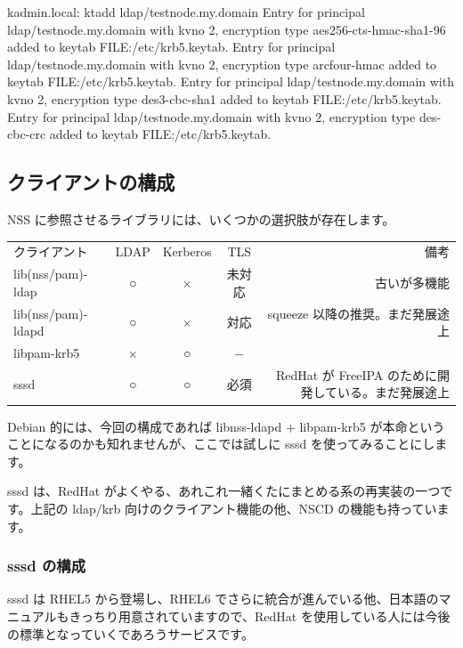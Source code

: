 \documentclass[mingoth,a4paper]{jsarticle}
\begin{document}
\begin{commandline}
kadmin.local:  ktadd ldap/testnode.my.domain
Entry for principal ldap/testnode.my.domain with kvno 2, encryption type aes256-cts-hmac-sha1-96 added to keytab
FILE:/etc/krb5.keytab.
Entry for principal ldap/testnode.my.domain with kvno 2, encryption type arcfour-hmac added to keytab FILE:/etc/krb5.keytab.
Entry for principal ldap/testnode.my.domain with kvno 2, encryption type des3-cbc-sha1 added to keytab FILE:/etc/krb5.keytab.
Entry for principal ldap/testnode.my.domain with kvno 2, encryption type des-cbc-crc added to keytab FILE:/etc/krb5.keytab.
\end{commandline}

\subsection{クライアントの構成}

NSS に参照させるライブラリには、いくつかの選択肢が存在します。

\begin{table}[htb]
  \begin{tabular}{lcccr}
    クライアント & LDAP & Kerberos & TLS & 備考 \\
    lib(nss/pam)-ldap & ○ & × & 未対応 & 古いが多機能 \\
    lib(nss/pam)-ldapd & ○ & × & 対応 & squeeze 以降の推奨。まだ発展途上 \\
    libpam-krb5 & × & ○ & − & \\
    sssd & ○ & ○ & 必須 & RedHat が FreeIPA のために開発している。まだ発展途上 \\
  \end{tabular}
\end{table}

Debian 的には、今回の構成であれば libnss-ldapd + libpam-krb5 が本命ということになるのかも知れませんが、ここでは試しに sssd を使ってみることにします。

sssd は、RedHat がよくやる、あれこれ一緒くたにまとめる系の再実装の一つです。上記の ldap/krb 向けのクライアント機能の他、NSCD の機能も持っています。

\subsubsection{sssd の構成}

sssd は RHEL5 から登場し、RHEL6 でさらに統合が進んでいる他、日本語のマニュアルもきっちり用意されていますので、RedHat を使用している人には今後の標準となっていくであろうサービスです。
\end{document}
